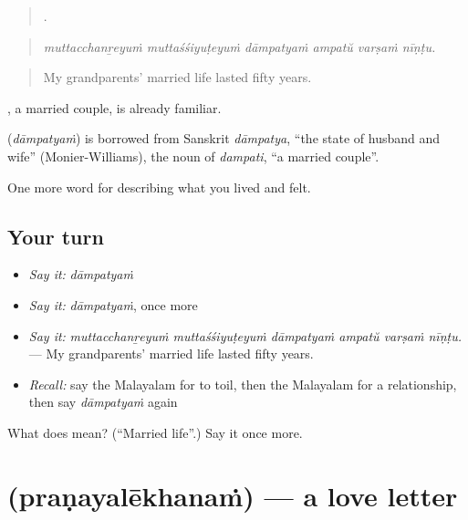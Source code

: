 \begin{quote}
     .
\end{quote}

\begin{quote}
\emph{muttacchanṟeyuṁ muttaśśiyuṭeyuṁ dāmpatyaṁ ampatŭ varṣaṁ nīṇṭu.}
\end{quote}

\begin{quote}
My grandparents' married life lasted fifty years.
\end{quote}

, a married couple, is already familiar.

\begin{cousinweb}
\textbf{} (\emph{dāmpatyaṁ}) is borrowed from Sanskrit \emph{dāmpatya}, \textquotedblleft{}the state of husband and wife\textquotedblright{} (Monier-Williams), the noun of \emph{dampati}, \textquotedblleft{}a married couple\textquotedblright{}.
\end{cousinweb}

\begin{grammarlens}[title={What you've built}]
One more word for describing what you lived and felt.
\end{grammarlens}

\subsection*{Your turn}
\begin{itemize}
\raggedright
  \item \emph{Say it:} \emph{dāmpatyaṁ}
  \item \emph{Say it:} \emph{dāmpatyaṁ}, once more
  \item \emph{Say it:} \emph{muttacchanṟeyuṁ muttaśśiyuṭeyuṁ dāmpatyaṁ ampatŭ varṣaṁ nīṇṭu.} — My grandparents' married life lasted fifty years.
  \item \emph{Recall:} say the Malayalam for to toil, then the Malayalam for a relationship, then say \emph{dāmpatyaṁ} again
\end{itemize}

\begin{tcolorbox}[breakable,colback=teal!4,colframe=teal!35!black,title={Before you move on}]
What does  mean? (\textquotedblleft{}Married life\textquotedblright{}.) Say it once more.
\end{tcolorbox}
\section[\texorpdfstring{\ml{പ്രണയലേഖനം} (praṇayalēkhanaṁ)}{പ്രണയലേഖനം (praṇayalēkhanaṁ)}]{ (praṇayalēkhanaṁ) — a love letter}

